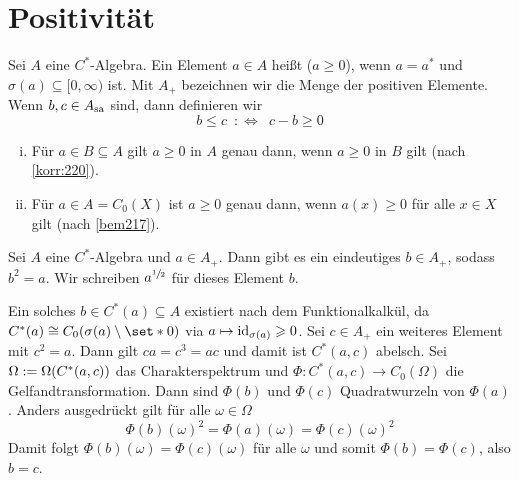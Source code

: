\section{Positivität} %
\label{sec:3}

\begin{definition}[{name=[Positivität]}]
	Sei $A$ eine $C^*$-Algebra. Ein Element $a \in A$ heißt  ($a \ge 0$), wenn $a=a^*$ und $\sigma(a) \subseteq [0,\infty)$ ist. Mit $A_+$ bezeichnen wir die 
	Menge der positiven Elemente. Wenn $b,c \in A_{\mathrm{sa}}$ sind, dann definieren wir 
	\[
		b \le c \enspace :\Longleftrightarrow \enspace c-b \ge 0
	\]
\end{definition}

\begin{bemerkung}[{name=[positive Elemente in Unteralgebren und in $C_0(X)$]},label=bem:32] \leavevmode
	\begin{enumerate}[(i),itemsep=2pt]
		\item Für $a \in B \subseteq A$ gilt $a \ge 0$ in $A$ genau dann, wenn $a \ge 0$ in $B$ gilt (nach \autoref{korr:220}).
		\item Für $a \in A = C_0(X)$ ist $a \ge 0$ genau dann, wenn $a(x) \ge 0$ für alle $x \in X$ gilt (nach \ref{bem217}).
	\end{enumerate}
\end{bemerkung}

\begin{proposition}[label=prop:33,{name=[Existenz von Quadratwurzeln]}]
	Sei $A$ eine $C^*$-Algebra und $a \in A_+$. Dann gibt es ein eindeutiges $b \in  A_+$, sodass $b^2=a$. Wir schreiben $a^{\sfrac{1}{2}}$ für dieses Element $b$.
\end{proposition}
\begin{beweis}
	Ein solches $b \in C^*(a) \subseteq A$ existiert nach dem Funktionalkalkül, da $C^*(a) \cong C_0 \enbrace*{\sigma(a) \setminus \set*{0}}$ via $a \mapsto \operatorname{id}_{\sigma(a)} \geqslant 0$.
	Sei $c \in A_+$ ein weiteres Element mit $c^2=a$. Dann gilt $ca=c^3=ac$ und damit ist $C^*(a,c)$ abelsch. 
	Sei $\Omega := \Omega \enbrace*{C^*(a,c)}$ das Charakterspektrum und $\Phi \colon C^*(a,c) \to C_0(\Omega)$ die Gelfandtransformation. 
	Dann sind $\Phi(b)$ und $\Phi(c)$ Quadratwurzeln von $\Phi(a)$. 
	Anders ausgedrückt gilt für alle $\omega \in \Omega$
	\[
		\Phi(b)(\omega)^2 = \Phi(a)(\omega) = \Phi(c)(\omega)^2
	\]
	Damit folgt $\Phi(b)(\omega)=\Phi(c)(\omega)$ für alle $\omega$ und somit $\Phi(b)=\Phi(c)$, also $b=c$.
\end{beweis}

